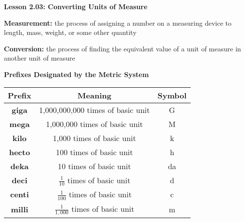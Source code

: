\begin{center}
\textbf{Lesson 2.03: Converting Units of Measure}
\end{center}

\vspace*{-1.5ex}

\textbf{Measurement:} the process of assigning a number on a measuring device to length, mass, weight, or some other quantity

\textbf{Conversion:} the process of finding the equivalent value of a unit of measure in another unit of measure


\begin{center}

\textbf{Prefixes Designated by the Metric System}

\begin{tabular}{|c|c|c|}
\hline
\textbf{Prefix} & \textbf{Meaning} & \textbf{Symbol} \\
\hline
\textbf{giga} & 1,000,000,000 times of basic unit & G \\
\hline
\textbf{mega} & 1,000,000 times of basic unit & M \\
\hline
\textbf{kilo} & 1,000 times of basic unit & k \\
\hline
\textbf{hecto} & 100 times of basic unit & h \\
\hline
\textbf{deka} & 10 times of basic unit & da \\
\hline
\textbf{deci} & $\tfrac{1}{10}$ times of basic unit & d \\
\hline
\textbf{centi} & $\tfrac{1}{100}$ times of basic unit & c \\
\hline
\textbf{milli} & $\tfrac{1}{1,000}$ times of basic unit & m \\
\hline
\end{tabular}

\end{center}

